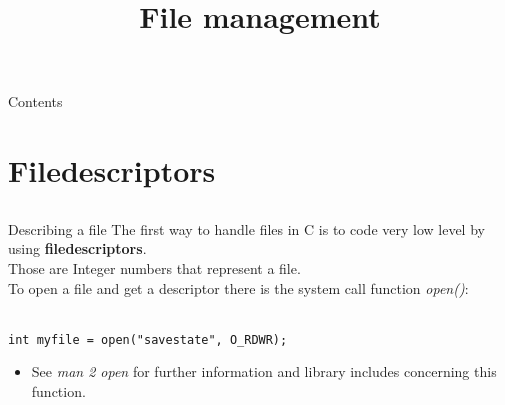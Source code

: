 
\newcommand{\topic}{
	File management
}

\title{\topic}
\supertitle{\course}
\date{}



\maketitle

\begin{frame}{Contents}
	\tableofcontents
\end{frame}

\section{Filedescriptors}
\subsection{}

\begin{frame}[fragile]{Describing a file}
	The first way to handle files in C is to code very low level by using \textbf{filedescriptors}.\\
	Those are Integer numbers that represent a file.\\
	To open a file and get a descriptor there is the system call function \textit{open()}:\\\ \\

	\begin{lstlisting}
int myfile = open("savestate", O_RDWR);
\end{lstlisting}

	\begin{itemize}
		\item See \textit{man 2 open} for further information and library includes concerning this function.
	\end{itemize}

\end{frame}

